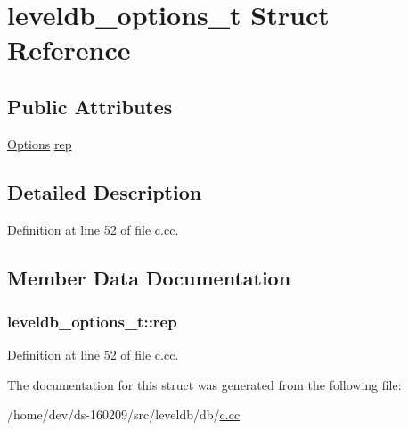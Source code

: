 \hypertarget{structleveldb__options__t}{}\section{leveldb\+\_\+options\+\_\+t Struct Reference}
\label{structleveldb__options__t}
\subsection*{Public Attributes}
\begin{DoxyCompactItemize}
\item 
\hyperlink{structleveldb_1_1_options}{Options} \hyperlink{structleveldb__options__t_a4f9a6dde987957ab489bf26c9d191df9}{rep}
\end{DoxyCompactItemize}


\subsection{Detailed Description}


Definition at line 52 of file c.\+cc.



\subsection{Member Data Documentation}
\hypertarget{structleveldb__options__t_a4f9a6dde987957ab489bf26c9d191df9}{}
\subsubsection[{rep}]{ leveldb\+\_\+options\+\_\+t\+::rep}\label{structleveldb__options__t_a4f9a6dde987957ab489bf26c9d191df9}


Definition at line 52 of file c.\+cc.



The documentation for this struct was generated from the following file\+:\begin{DoxyCompactItemize}
\item 
/home/dev/ds-\/160209/src/leveldb/db/\hyperlink{c_8cc}{c.\+cc}\end{DoxyCompactItemize}
